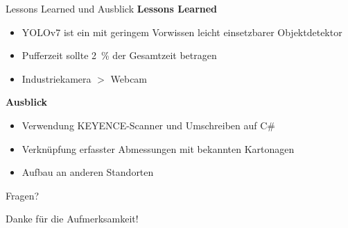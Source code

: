 \documentclass[10pt,ngerman]{beamer}
\begin{document}
\begin{frame}[fragile]{Lessons Learned und Ausblick}
  \textbf{Lessons Learned}
  \begin{itemize}
    \item YOLOv7 ist ein mit geringem Vorwissen leicht einsetzbarer Objektdetektor
          \pause
    \item Pufferzeit sollte \SI{2}{\percent} der Gesamtzeit betragen
          \pause
    \item Industriekamera $>$ Webcam
  \end{itemize}

  \pause

  \textbf{Ausblick}
  \begin{itemize}
    \item Verwendung KEYENCE-Scanner und Umschreiben auf C\#
          \pause
    \item Verknüpfung erfasster Abmessungen mit bekannten Kartonagen
          \pause
    \item Aufbau an anderen Standorten
  \end{itemize}
\end{frame}


\begin{frame}[standout]
  Fragen?
\end{frame}



\appendix


\begin{frame}[standout]
  Danke für die Aufmerksamkeit!
\end{frame}
\end{document}
